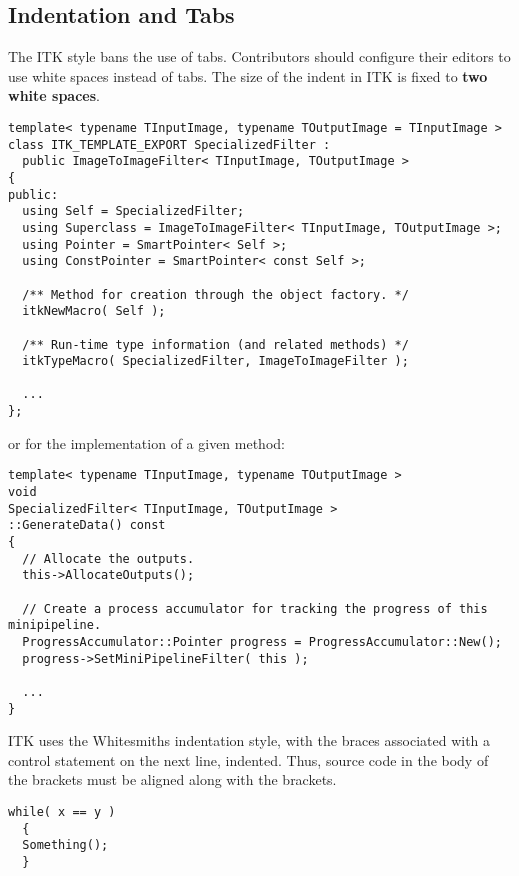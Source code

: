 \subsection{Indentation and Tabs}
\label{subsec:IndentationAndTabs}

The ITK style bans the use of tabs. Contributors should configure their editors
to use white spaces instead of tabs. The size of the indent in ITK is fixed to
\textbf{two white spaces}.

\small
\begin{verbatim}
template< typename TInputImage, typename TOutputImage = TInputImage >
class ITK_TEMPLATE_EXPORT SpecializedFilter :
  public ImageToImageFilter< TInputImage, TOutputImage >
{
public:
  using Self = SpecializedFilter;
  using Superclass = ImageToImageFilter< TInputImage, TOutputImage >;
  using Pointer = SmartPointer< Self >;
  using ConstPointer = SmartPointer< const Self >;

  /** Method for creation through the object factory. */
  itkNewMacro( Self );

  /** Run-time type information (and related methods) */
  itkTypeMacro( SpecializedFilter, ImageToImageFilter );

  ...
};
\end{verbatim}
\normalsize

or for the implementation of a given method:

\small
\begin{verbatim}
template< typename TInputImage, typename TOutputImage >
void
SpecializedFilter< TInputImage, TOutputImage >
::GenerateData() const
{
  // Allocate the outputs.
  this->AllocateOutputs();

  // Create a process accumulator for tracking the progress of this minipipeline.
  ProgressAccumulator::Pointer progress = ProgressAccumulator::New();
  progress->SetMiniPipelineFilter( this );

  ...
}
\end{verbatim}
\normalsize

ITK uses the Whitesmiths indentation style, with the braces associated with
a control statement on the next line, indented. Thus, source code in the body of
the brackets must be aligned along with the brackets.

\small
\begin{verbatim}
while( x == y )
  {
  Something();
  }
\end{verbatim}
\normalsize


